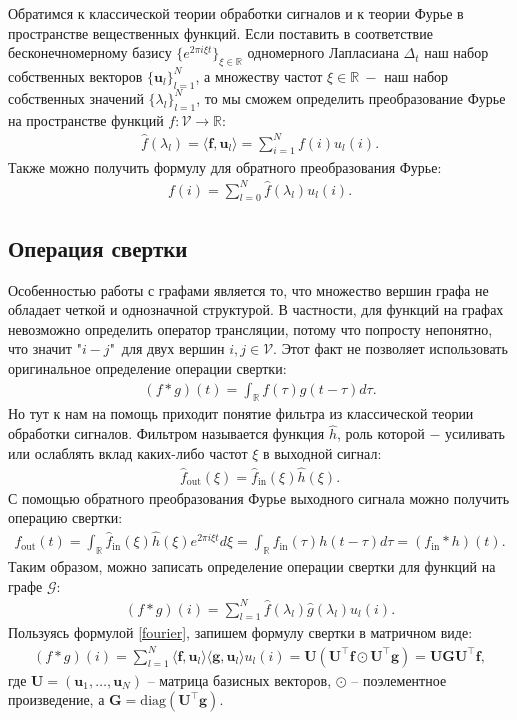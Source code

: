 \documentclass[]{article}
\let\v\mathbf
\begin{document}
Обратимся к классической теории обработки сигналов и к теории Фурье в пространстве вещественных функций. Если поставить в соответствие бесконечномерному базису $\{e^{2\pi{i}\xi{t}}\}_{\xi\in\mathbb{R}}$ одномерного Лапласиана $\Delta_t$ наш набор собственных векторов $\{\v{u}_l\}_{l=1}^{N}$, а множеству частот ${\xi\in\mathbb{R}}\ -$ наш набор собственных значений $\{\lambda_l\}_{l=1}^{N}$, то мы сможем определить преобразование Фурье на пространстве функций $f:\mathcal{V}\to\mathbb{R}$:
\begin{align}\label{fourier}
    \hat{f}(\lambda_l)=\langle\v{f},\v{u}_l\rangle=\sum_{i=1}^{N}f(i)u_l(i).
\end{align}
Также можно получить формулу для обратного преобразования Фурье:
\begin{align}
    f(i)=\sum_{l=0}^{N}\hat{f}(\lambda_l)u_l(i).
\end{align}

\subsection*{Операция свертки}

Особенностью работы с графами является то, что множество вершин графа не обладает четкой и однозначной структурой. В частности, для функций на графах невозможно определить оператор трансляции, потому что попросту непонятно, что значит "$i-j$"\ для двух вершин $i,j\in\mathcal{V}$. Этот факт не позволяет использовать оригинальное определение операции свертки:
\begin{align}
    (f*g)(t)=\int_{\mathbb{R}}{f(\tau)g(t-\tau)d\tau}.
\end{align}
Но тут к нам на помощь приходит понятие фильтра из классической теории обработки сигналов. Фильтром называется функция $\hat{h}$, роль которой $-$ усиливать или ослаблять вклад каких-либо частот $\xi$ в выходной сигнал:
\begin{align}\label{convolut}
    \hat{f}_{\text{out}}(\xi)=\hat{f}_{\text{in}}(\xi)\hat{h}(\xi).
\end{align}
С помощью обратного преобразования Фурье выходного сигнала можно получить операцию свертки:
\begin{align}
    f_{\text{out}}(t)=\int_{\mathbb{R}}{\hat{f}_{\text{in}}(\xi)\hat{h}(\xi)e^{2\pi{i}\xi{t}}d\xi}=\int_{\mathbb{R}}{f_{\text{in}}(\tau)h(t-\tau)d\tau}=(f_{\text{in}}*h)(t).
\end{align}
Таким образом, можно записать определение операции свертки для функций на графе $\mathcal{G}$:
\begin{align}\label{spectral_conv}
    (f*g)(i)=\sum_{l=1}^{N}\hat{f}(\lambda_l)\hat{g}(\lambda_l)u_l(i).
\end{align}
Пользуясь формулой \eqref{fourier}, запишем формулу свертки в матричном виде:
\begin{align}\label{mat_conv}
    (f*g)(i)=\sum_{l=1}^{N}\langle\v{f},\v{u}_l\rangle\langle\v{g},\v{u}_l\rangle u_l(i)=\v{U}(\v{U}^{\top}\v{f}\odot\v{U}^{\top}\v{g})=\v{U}\v{G}\v{U}^{\top}\v{f},
\end{align}
где $\v{U}=(\v{u}_1,\dots,\v{u}_N)$ -- матрица базисных векторов, $\odot$ -- поэлементное произведение, а $\v{G}=\text{diag}(\v{U}^{\top}\v{g})$.
\end{document}
